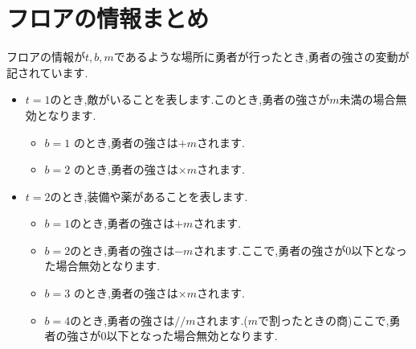 \documentclass[a4paper,10pt]{ltjsarticle}
\begin{document}
\section*{フロアの情報まとめ}
フロアの情報が$t,b,m$であるような場所に勇者が行ったとき,勇者の強さの変動が記されています.
\begin{itemize}
  \item $t=1$のとき,敵がいることを表します.このとき,勇者の強さが$m$未満の場合無効となります.
    \begin{itemize}
      \item $b = 1$ のとき,勇者の強さは$+m$されます.
      \item $b = 2$ のとき,勇者の強さは$\times m$されます.
    \end{itemize}
  \item $t=2$のとき,装備や薬があることを表します.
    \begin{itemize}
      \item $b = 1$のとき,勇者の強さは$+m$されます.
      \item $b = 2$のとき,勇者の強さは$-m$されます.ここで,勇者の強さが$0$以下となった場合無効となります.
      \item $b = 3$ のとき,勇者の強さは$\times m$されます.
      \item $b = 4$のとき,勇者の強さは$// m$されます.($m$で割ったときの商)ここで,勇者の強さが$0$以下となった場合無効となります.
    \end{itemize}
\end{itemize}
\end{document}
